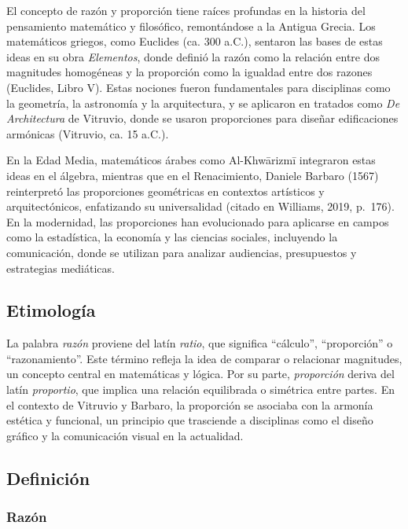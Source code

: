 \documentclass[
  stu,
  floatsintext,
  longtable,
  a4paper,
  nolmodern,
  notxfonts,
  notimes,
  colorlinks=true,linkcolor=blue,citecolor=blue,urlcolor=blue]{apa7}
\begin{document}
El concepto de razón y proporción tiene raíces profundas en la historia
del pensamiento matemático y filosófico, remontándose a la Antigua
Grecia. Los matemáticos griegos, como Euclides (ca. 300 a.C.), sentaron
las bases de estas ideas en su obra \emph{Elementos}, donde definió la
razón como la relación entre dos magnitudes homogéneas y la proporción
como la igualdad entre dos razones (Euclides, Libro V). Estas nociones
fueron fundamentales para disciplinas como la geometría, la astronomía y
la arquitectura, y se aplicaron en tratados como \emph{De Architectura}
de Vitruvio, donde se usaron proporciones para diseñar edificaciones
armónicas (Vitruvio, ca. 15 a.C.).

En la Edad Media, matemáticos árabes como Al-Khwārizmī integraron estas
ideas en el álgebra, mientras que en el Renacimiento, Daniele Barbaro
(1567) reinterpretó las proporciones geométricas en contextos artísticos
y arquitectónicos, enfatizando su universalidad (citado en Williams,
2019, p.~176). En la modernidad, las proporciones han evolucionado para
aplicarse en campos como la estadística, la economía y las ciencias
sociales, incluyendo la comunicación, donde se utilizan para analizar
audiencias, presupuestos y estrategias mediáticas.

\subsection{Etimología}\label{etimologuxeda}

La palabra \emph{razón} proviene del latín \emph{ratio}, que significa
``cálculo'', ``proporción'' o ``razonamiento''. Este término refleja la
idea de comparar o relacionar magnitudes, un concepto central en
matemáticas y lógica. Por su parte, \emph{proporción} deriva del latín
\emph{proportio}, que implica una relación equilibrada o simétrica entre
partes. En el contexto de Vitruvio y Barbaro, la proporción se asociaba
con la armonía estética y funcional, un principio que trasciende a
disciplinas como el diseño gráfico y la comunicación visual en la
actualidad.

\subsection{Definición}\label{definiciuxf3n}

\subsubsection{Razón}\label{razuxf3n}
\end{document}
